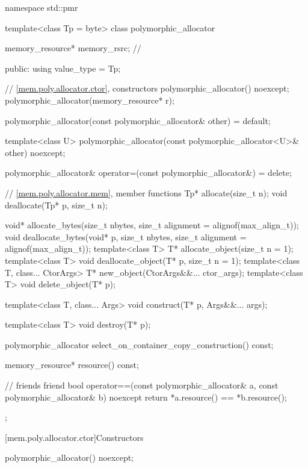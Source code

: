 %
%
\begin{codeblock}
namespace std::pmr {
  template<class Tp = byte> class polymorphic_allocator {
    memory_resource* memory_rsrc;       // \expos

  public:
    using value_type = Tp;

    // \ref{mem.poly.allocator.ctor}, constructors
    polymorphic_allocator() noexcept;
    polymorphic_allocator(memory_resource* r);

    polymorphic_allocator(const polymorphic_allocator& other) = default;

    template<class U>
      polymorphic_allocator(const polymorphic_allocator<U>& other) noexcept;

    polymorphic_allocator& operator=(const polymorphic_allocator&) = delete;

    // \ref{mem.poly.allocator.mem}, member functions
    Tp* allocate(size_t n);
    void deallocate(Tp* p, size_t n);

    void* allocate_bytes(size_t nbytes, size_t alignment = alignof(max_align_t));
    void deallocate_bytes(void* p, size_t nbytes, size_t alignment = alignof(max_align_t));
    template<class T> T* allocate_object(size_t n = 1);
    template<class T> void deallocate_object(T* p, size_t n = 1);
    template<class T, class... CtorArgs> T* new_object(CtorArgs&&... ctor_args);
    template<class T> void delete_object(T* p);

    template<class T, class... Args>
      void construct(T* p, Args&&... args);

    template<class T>
      void destroy(T* p);

    polymorphic_allocator select_on_container_copy_construction() const;

    memory_resource* resource() const;

    // friends
    friend bool operator==(const polymorphic_allocator& a,
                           const polymorphic_allocator& b) noexcept {
      return *a.resource() == *b.resource();
    }
  };
}
\end{codeblock}

[mem.poly.allocator.ctor]{Constructors}

%
\begin{itemdecl}
polymorphic_allocator() noexcept;
\end{itemdecl}

